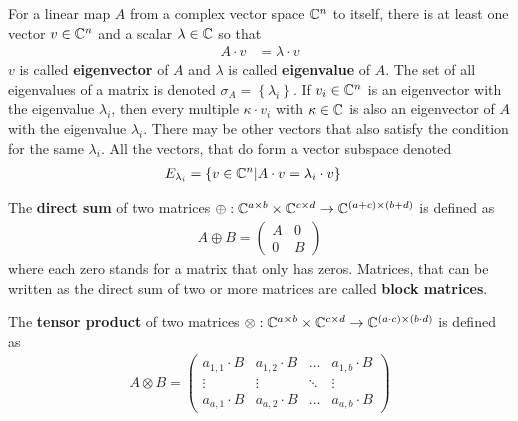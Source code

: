 For a linear map $A$ from a complex vector space $\mathbb{C}^n$ to itself, there is at least one vector $v \in \mathbb{C}^n$ and a scalar $\lambda \in \mathbb{C}$ so that
\begin{align}
    A \cdot v & = \lambda \cdot v
\end{align}
$v$ is called \textbf{eigenvector} of $A$ and $\lambda$ is called \textbf{eigenvalue} of $A$.
The set of all eigenvalues of a matrix is denoted $\sigma_A = \left\{ \lambda_i \right\}$.
If $v_i \in \mathbb{C}^n$ is an eigenvector with the eigenvalue $\lambda_i$, then every multiple $\kappa \cdot v_i$ with $\kappa \in \mathbb{C}$ is also an eigenvector of $A$ with the eigenvalue $\lambda_i$.
There may be other vectors that also satisfy the condition for the same $\lambda_i$.
All the vectors, that do form a vector subspace denoted
\begin{align}
    E_{\lambda_i} & = \left\{ v \in \mathbb{C}^n | A \cdot v = \lambda_i \cdot v \right\}
\end{align}




The \textbf{direct sum} of two matrices $\oplus: \mathbb{C}^{a \times b} \times \mathbb{C}^{c \times d} \to \mathbb{C}^{(a + c) \times (b + d)}$ is defined as
\begin{align}
    A \oplus B = \begin{pmatrix}
        A & 0 \\
        0 & B
    \end{pmatrix}
\end{align}
where each zero stands for a matrix that only has zeros.
Matrices, that can be written as the direct sum of two or more matrices are called \textbf{block matrices}.

The \textbf{tensor product} of two matrices $\otimes: \mathbb{C}^{a \times b} \times \mathbb{C}^{c \times d} \to \mathbb{C}^{(a \cdot c) \times (b \cdot d)}$ is defined as
\begin{align}
    A \otimes B = \begin{pmatrix}
        a_{1, 1} \cdot B & a_{1, 2} \cdot B & \ldots & a_{1, b} \cdot B \\
        \vdots & \vdots & \ddots & \vdots \\
        a_{a, 1} \cdot B & a_{a, 2} \cdot B & \ldots & a_{a, b} \cdot B
    \end{pmatrix}
\end{align}

